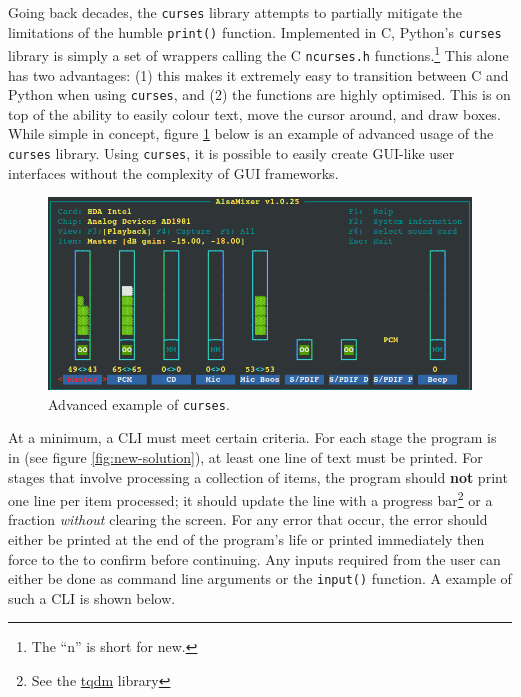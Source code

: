 \documentclass[11pt]{article}
\begin{document}
Going back decades, the \texttt{curses} library attempts to partially mitigate the limitations of the humble \texttt{print()} function. Implemented in C, Python's \texttt{curses} library is simply a set of wrappers calling the C \texttt{ncurses.h} functions.\footnote{The ``n'' is short for new.} This alone has two advantages: (1) this makes it extremely easy to transition between C and Python when using \texttt{curses}, and (2) the functions are highly optimised. This is on top of the ability to easily colour text, move the cursor around, and draw boxes. While simple in concept, figure \ref{fig:ncurses-example} below is an example of advanced usage of the \texttt{curses} library. Using \texttt{curses}, it is possible to easily create GUI-like user interfaces without the complexity of GUI frameworks.

\begin{figure}[b!]
    \centering
    \includegraphics[width=\textwidth]{figures/ncurses_example.png}
    \caption{Advanced example of \texttt{curses}.}
    \label{fig:ncurses-example}
\end{figure}

At a minimum, a CLI must meet certain criteria. For each stage the program is in (see figure \ref{fig:new-solution}), at least one line of text must be printed. For stages that involve processing a collection of items, the program should \textbf{not} print one line per item processed; it should update the line with a progress bar\footnote{See the \href{https://pypi.org/project/tqdm/}{tqdm} library} or a fraction \textit{without} clearing the screen. For any error that occur, the error should either be printed at the end of the program's life or printed immediately then force to the to confirm before continuing. Any inputs required from the user can either be done as command line arguments or the \texttt{input()} function. A example of such a CLI is shown below.
\end{document}
